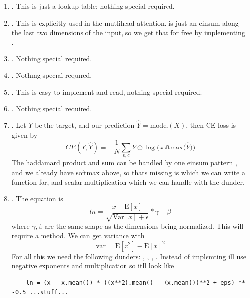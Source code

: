 \documentclass[11pt]{article}
\begin{document}
\begin{enumerate}
  \item {}. This is just a lookup table; nothing special required. 
  \item {}. This is explicitly used in the mutlihead-attention.  is just an einsum along the
    last two dimensions of the input, so we get that for free by implementing .
  \item {}. Nothing special required. 
  \item {}. Nothing special required.
  \item {}. This is easy to implement and read, nothing special required. 
  \item {}. Nothing special required.
  \item {}. Let $Y$ be the target, and our prediction 
    $\hat{Y} = \text{model}(X)$, then CE loss is given by
    \begin{equation}
      CE(Y, \hat{Y}) = -\frac{1}{N}\sum_{n, c}Y \odot \log \bigg(\text{softmax} \big(\hat{Y}\big) \bigg) 
    \end{equation}
    The haddamard product and sum can be handled by one einsum pattern , and we already
    have softmax above, so thats missing is  which we can write a function for, 
    and scalar multiplication which we can handle with the  dunder.  
  \item {}. The equation is
    \begin{equation}
      ln = \frac{x - \text{E}[x]}{\sqrt{\text{Var}[x] + \epsilon}} * \gamma + \beta
    \end{equation}
    where $\gamma, \beta$ are the same shape as the dimensions being normalized. This will require a  
    method. We can get variance with
    \begin{equation}
      \text{var} = \text{E}[x^2] - \text{E}[x]^2
    \end{equation}
    For all this we need the following dunders: , , , . 
    Instead of implemting  ill use negative exponents and multiplication so itll look like 
    \begin{verbatim}
    ln = (x - x.mean()) * ((x**2).mean() - (x.mean())**2 + eps) ** -0.5 ...stuff...
    \end{verbatim}
\end{enumerate}
\end{document}
